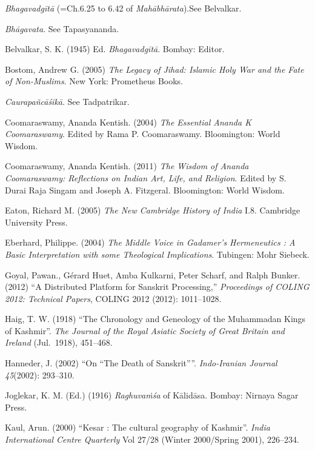 \begin{thebibliography}{99}
\itemsep=2pt
{\sl Bhagavadgītā} (=Ch.6.25 to 6.42 of {\sl Mahābhārata}).See Belvalkar.

{\sl Bhāgavata}. See Tapasyananda.

Belvalkar, S. K. (1945) Ed. {\sl Bhagavadgītā}. Bombay: Editor.

Bostom, Andrew G. (2005) {\sl The Legacy of Jihad: Islamic Holy War and the Fate of Non-Muslims}. New York: Prometheus Books.

{\sl Caurapañcāśikā}. See Tadpatrikar.

Coomaraswamy, Ananda Kentish. (2004) {\sl The Essential Ananda K Coomaraswamy}. Edited by Rama P. Coomaraswamy. Bloomington: World Wisdom.

Coomaraswamy, Ananda Kentish. (2011) {\sl The Wisdom of Ananda Coomaraswamy: Reflections on Indian Art, Life, and Religion}. Edited by S. Durai Raja Singam and Joseph A. Fitzgeral. Bloomington: World Wisdom.

Eaton, Richard M. (2005) {\sl The New Cambridge History of India} I.8. Cambridge University Press.

Eberhard, Philippe. (2004) {\sl The Middle Voice in Gadamer’s Hermeneutics : A Basic Interpretation with some Theological Implications}. Tubingen: Mohr Siebeck. 

Goyal, Pawan., Gérard Huet, Amba Kulkarni, Peter Scharf, and Ralph Bunker. (2012) “A Distributed Platform for Sanskrit Processing,” {\sl Proceedings of COLING 2012: Technical Papers}, COLING 2012 (2012): 1011--1028.

Haig, T. W. (1918) “The Chronology and Geneology of the Muhammadan Kings of Kashmir”.  {\sl The Journal of the Royal Asiatic Society of Great Britain and Ireland} (Jul.~1918), 451--468.

Hanneder, J. (2002) “On “The Death of Sanskrit””. {\sl Indo-Iranian Journal 45}(2002): 293--310.

Joglekar, K. M. (Ed.) (1916) {\sl Raghuvaṁśa} of Kālidāsa. Bombay: Nirnaya Sagar Press.

Kaul, Arun. (2000) “Kesar : The cultural geography of Kashmir”. {\sl India International Centre Quarterly} Vol 27/28 (Winter 2000/Spring 2001), 226--234.


\end{thebibliography}
